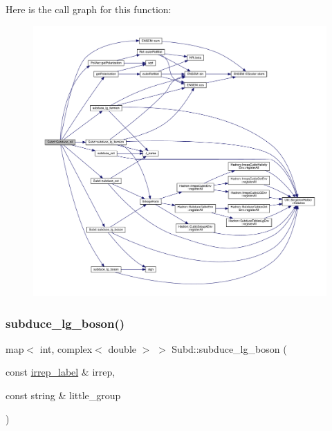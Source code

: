 Here is the call graph for this function\+:
\nopagebreak
\begin{figure}[H]
\begin{center}
\leavevmode
\includegraphics[width=350pt]{d8/d2b/namespaceSubd_a8712bb4f2b8dfa69f03cc781b7d48e85_cgraph}
\end{center}
\end{figure}
\mbox{\label{namespaceSubd_a5f31b3ef70ad25320a8010ec3017eb04}} 
\subsubsection{\texorpdfstring{subduce\_lg\_boson()}{subduce\_lg\_boson()}}
{\footnotesize\ttfamily map$<$ int, complex$<$ double $>$ $>$ Subd\+::subduce\+\_\+lg\+\_\+boson (\begin{DoxyParamCaption}\item[{const \mbox{\hyperlink{structirrep__label}{irrep\+\_\+label}} \&}]{irrep,  }\item[{const string \&}]{little\+\_\+group }\end{DoxyParamCaption})}

